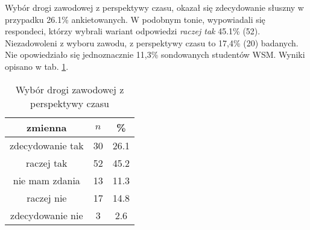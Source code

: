 


Wybór drogi zawodowej z perspektywy czasu, okazał się  zdecydowanie słuszny w przypadku 26.1\% ankietowanych. W podobnym tonie, wypowiadali się respondeci, którzy wybrali wariant odpowiedzi \textit{raczej tak} 45.1\% (52). Niezadowoleni z wyboru zawodu, z perspektywy czasu to 17,4\% (20) badanych. Nie opowiedziało się jednoznacznie 11,3\% sondowanych studentów WSM. Wyniki opisano w tab. \ref{tab:Q36}.
\begin{table}[H]
\caption{Wybór drogi zawodowej z perspektywy czasu}
\centering
\begin{tabular}{ | c | c | c |}
\hline
zmienna & $n$ & \% \\
\hline
zdecydowanie tak  &  30  & 26.1\\
\hline
raczej tak  &  52  & 45.2 \\
\hline
nie mam zdania  &  13  & 11.3 \\
\hline
raczej nie  &  17  & 14.8 \\
\hline
zdecydowanie nie  &  3  & 2.6\\
\hline
\end{tabular}
\label{tab:Q36}
\end{table}
